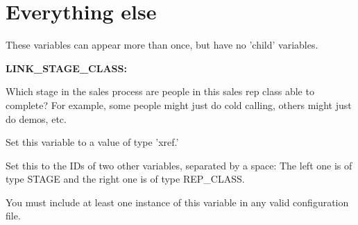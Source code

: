 \section{Everything else}


These variables can appear more than once, but have no 'child' variables.


\textbf{LINK\_STAGE\_CLASS:}


Which stage in the sales process are people in this sales rep class able to complete?  For example, some people might just do cold calling, others might just do demos, etc.

Set this variable to a value of type 'xref.'

Set this to the IDs of two other variables, separated by a space:  The left one is of type STAGE and the right one is of type REP\_CLASS.

You must include at least one instance of this variable in any valid configuration file.

\LastPage{}


